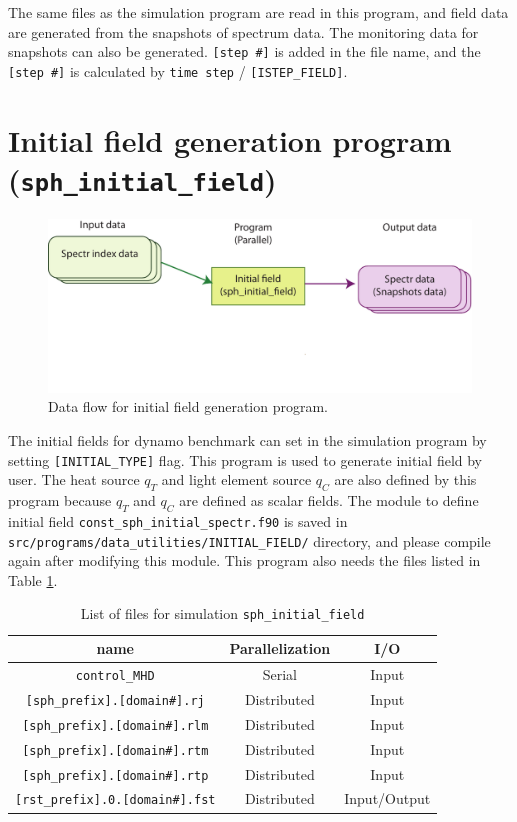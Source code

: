 The same files as the simulation program are read in this program, and field data are generated from the snapshots of spectrum data. The monitoring data for snapshots can also be generated. \verb|[step #]| is added in the file name, and the \verb|[step #]| is calculated by \verb|time step| / \verb|[ISTEP_FIELD]|.

\newpage
\section{Initial field generation program \\
({\tt sph\_initial\_field})}
\label{sec:sph_initial_field}
%
\begin{figure}[htbp]
\begin{center}
\includegraphics*[width=130mm]{images/flow_ini}
\end{center}
\caption{Data flow for initial field generation program.}
\label{fig:flow_ini}
\end{figure}
%
 The initial fields for dynamo benchmark can set in the simulation program by setting \verb|[INITIAL_TYPE]| flag. This program is used to generate initial field by user.  The heat source $q_{T}$ and light element source $q_{C}$ are also defined by this program because $q_{T}$ and $q_{C}$ are defined as scalar fields.  The module to define initial field \verb|const_sph_initial_spectr.f90| is saved in \verb|src/programs/data_utilities/INITIAL_FIELD/| directory,  and please compile again after modifying this module. This program also needs the files listed in Table \ref{table:inital_fld}.
%
\begin{table}[htdp]
\caption{List of files for simulation {\tt sph\_initial\_field} }
\begin{center} 
\begin{tabular}{|c|c|c|}
\hline
 name & Parallelization & I/O \\ \hline \hline
\verb|control_MHD| & Serial & Input \\ \hline
\verb|[sph_prefix].[domain#].rj|  & Distributed & Input \\
\verb|[sph_prefix].[domain#].rlm| & Distributed & Input \\
\verb|[sph_prefix].[domain#].rtm| & Distributed & Input \\
\verb|[sph_prefix].[domain#].rtp| & Distributed & Input \\ \hline
\verb|[rst_prefix].0.[domain#].fst| &  Distributed & Input/Output  \\ \hline
\end{tabular}
\end{center}
\label{table:inital_fld}
\end{table}
